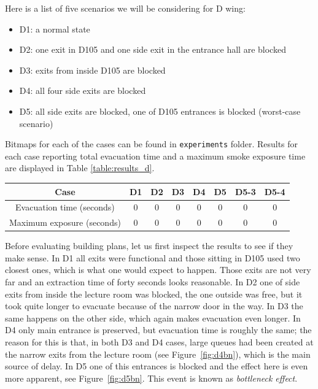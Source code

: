 Here is a list of five scenarios we will be considering for D wing:

\begin{itemize}
    \item D1: a normal state
    \item D2: one exit in D105 and one side exit in the entrance hall are
    blocked
    \item D3: exits from inside D105 are blocked
    \item D4: all four side exits are blocked
    \item D5: all side exits are blocked, one of D105 entrances is blocked
    (worst-case scenario)
\end{itemize}

Bitmaps for each of the cases can be found in \texttt{experiments} folder.
Results for each case reporting total evacuation time and a maximum smoke
exposure time are displayed in Table \ref{table:results_d}.

\begin{center}
    \label{table:results_d}
    \begin{tabular}{ c | c | c | c | c | c | c | c }
        \hline
        Case & D1 & D2 & D3 & D4 & D5 & D5-3 & D5-4 \\
        \hline
        Evacuation time (seconds) & 0 & 0 & 0 & 0 & 0 & 0 & 0 \\
        Maximum exposure (seconds) & 0 & 0 & 0 & 0 & 0 & 0 & 0 \\
        \hline
    \end{tabular}
\end{center}

Before evaluating building plans, let us first inspect the results to see if
they make sense.
In D1 all exits were functional and those sitting in D105 used two closest ones,
which is what one would expect to happen.
Those exits are not very far and an extraction time of forty seconds looks
reasonable.
In D2 one of side exits from inside the lecture room was blocked, the one
outside was free, but it took quite longer to evacuate because of the
narrow door in the way.
In D3 the same happens on the other side, which again makes evacuation even
longer.
In D4 only main entrance is preserved, but evacuation time is roughly the same;
the reason for this is that, in both D3 and D4 cases, large queues had been
created at the narrow exits from the lecture room
(see Figure~\ref{fig:d4bn}), which is the main source of delay.
In D5 one of this entrances is blocked and the effect here is even more
apparent, see Figure~\ref{fig:d5bn}.
This event is known as \emph{bottleneck effect}.

